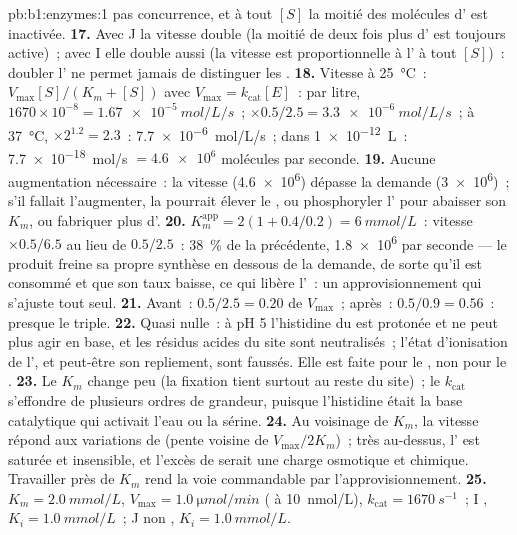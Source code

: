 \begin{solution}{pb:b1:enzymes:1}
pas concurrence, et à tout $[S]$ la moitié des molécules d' est
inactivée.
\textbf{17.} Avec J la vitesse double (la moitié de deux fois plus
d' est toujours active)~; avec I elle double aussi (la vitesse est
proportionnelle à l' à tout $[S]$)~: doubler l' ne permet
jamais de distinguer les .
\textbf{18.} Vitesse à \qty{25}{\celsius}~: $V_{\max}[S]/(K_m + [S])$
avec $V_{\max} = k_{\text{cat}}[E]$~: par litre, $1670\times 10^{-8} =
\qty{1.67e-5}{mol/L/s}$~; $\times 0.5/2.5 = \qty{3.3e-6}{mol/L/s}$~; à
\qty{37}{\celsius}, $\times 2^{1.2} = 2.3$~: \qty{7.7e-6}{mol/L/s}~; dans
\qty{1e-12}{L}~: \qty{7.7e-18}{mol/s} $= \num{4.6e6}$ molécules par
seconde.
\textbf{19.} Aucune augmentation nécessaire~: la vitesse (\num{4.6e6})
dépasse la demande (\num{3e6})~; s'il fallait l'augmenter, la 
pourrait élever le , ou phosphoryler l' pour abaisser son
$K_m$, ou fabriquer plus d'.
\textbf{20.} $K_m^{\text{app}} = 2(1 + 0.4/0.2) = \qty{6}{mmol/L}$~:
vitesse $\times 0.5/6.5$ au lieu de $0.5/2.5$~: \qty{38}{\%} de la
précédente, \num{1.8e6} par seconde --- le produit freine sa propre
synthèse en dessous de la demande, de sorte qu'il est consommé et que
son taux baisse, ce qui libère l'~: un approvisionnement qui
s'ajuste tout seul.
\textbf{21.} Avant~: $0.5/2.5 = 0.20$ de $V_{\max}$~; après~: $0.5/0.9 =
0.56$~: presque le triple.
\textbf{22.} Quasi nulle~: à pH 5 l'histidine du  est protonée
et ne peut plus agir en base, et les résidus acides du site sont
neutralisés~; l'état d'ionisation de l', et peut-être son
repliement, sont faussés. Elle est faite pour le , non pour le
.
\textbf{23.} Le $K_m$ change peu (la fixation tient surtout au reste du
site)~; le $k_{\text{cat}}$ s'effondre de plusieurs ordres de grandeur,
puisque l'histidine était la base catalytique qui activait l'eau ou la
sérine.
\textbf{24.} Au voisinage de $K_m$, la vitesse répond aux variations de
 (pente voisine de $V_{\max}/2K_m$)~; très au-dessus, l'
est saturée et insensible, et l'excès de  serait une charge
osmotique et chimique. Travailler près de $K_m$ rend la voie
commandable par l'approvisionnement.
\textbf{25.} $K_m = \qty{2.0}{mmol/L}$, $V_{\max} = \qty{1.0}{\micro mol/min}$
( à \qty{10}{nmol/L}), $k_{\text{cat}} = \qty{1670}{s^{-1}}$~; I
, $K_i = \qty{1.0}{mmol/L}$~; J non , $K_i =
\qty{1.0}{mmol/L}$.
\end{solution}
